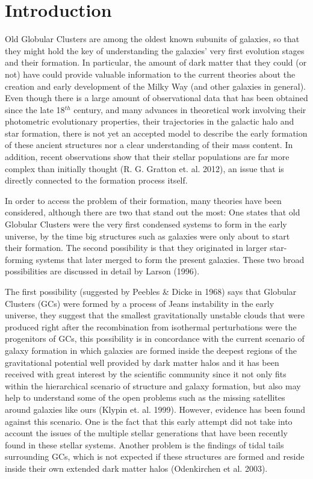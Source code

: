 \chapter{Introduction}

Old Globular Clusters are among the oldest known subunits of galaxies, so that they might hold the key of understanding the galaxies' very first evolution stages and their formation. In particular, the amount of dark matter that they could (or not) have could provide valuable information to the current theories about the creation and early development of the Milky Way (and other galaxies in general). Even though there is a large amount of observational data that has been obtained since the late 18$^{th}$ century, and many advances in theoretical work involving their photometric evolutionary properties, their trajectories in the galactic halo and star formation, there is not yet an accepted model to describe the early formation of these ancient structures nor a clear understanding of their mass content. In addition, recent observations show that their stellar populations are far more complex than initially thought (R. G. Gratton et. al. 2012), an issue that is directly connected to the formation process itself. 

In order to access the problem of their formation, many theories have been considered, although there are two that stand out the most: One states that old Globular Clusters were the very first condensed systems to form in the early universe, by the time big structures such as galaxies were only about to start their formation. The second possibility is that they originated in larger star-forming systems that later merged to form the present galaxies. These two broad possibilities are discussed in detail by Larson (1996).

The first possibility (suggested by Peebles \& Dicke in 1968) says that Globular Clusters (GCs) were formed by a process of Jeans instability in the early universe, they suggest that the smallest gravitationally unstable clouds that were produced right after the recombination from isothermal perturbations were the progenitors of GCs, this possibility is in concordance with the current scenario of galaxy formation in which galaxies are formed inside the deepest regions of the gravitational potential well provided by dark matter halos and it has been received with great interest by the scientific community since it not only fits within the hierarchical scenario of structure and galaxy formation, but also may help to understand some of the open problems such as the missing satellites around galaxies like ours (Klypin et. al. 1999). However, evidence has been found against this scenario. One is the fact that this early attempt did not take into account the issues of the multiple stellar generations that have been recently found in these stellar systems. Another problem is the findings of tidal tails surrounding GCs, which is not expected if these structures are formed and reside inside their own extended dark matter halos (Odenkirchen et al. 2003).

